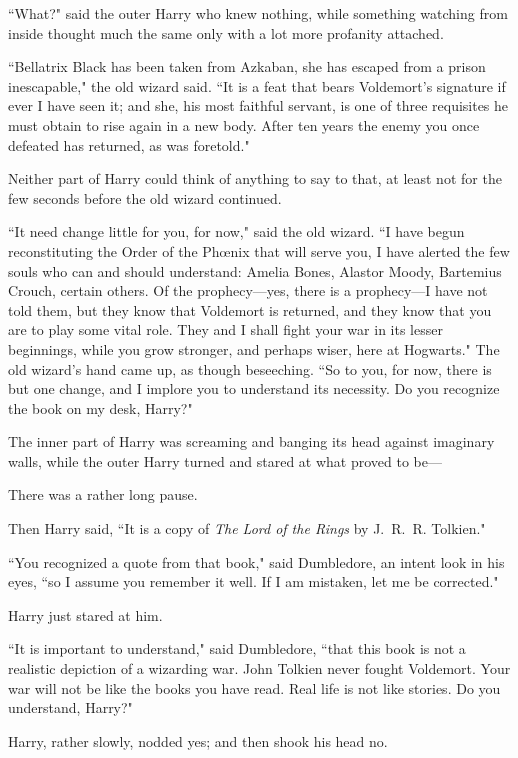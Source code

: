 ``What?" said the outer Harry who knew nothing, while something watching from inside thought much the same only with a lot more profanity attached.

``Bellatrix Black has been taken from Azkaban, she has escaped from a prison inescapable," the old wizard said. ``It is a feat that bears Voldemort's signature if ever I have seen it; and she, his most faithful servant, is one of three requisites he must obtain to rise again in a new body. After ten years the enemy you once defeated has returned, as was foretold."

Neither part of Harry could think of anything to say to that, at least not for the few seconds before the old wizard continued.

``It need change little for you, for now," said the old wizard. ``I have begun reconstituting the Order of the Phœnix that will serve you, I have alerted the few souls who can and should understand: Amelia Bones, Alastor Moody, Bartemius Crouch, certain others. Of the prophecy—yes, there is a prophecy—I have not told them, but they know that Voldemort is returned, and they know that you are to play some vital role. They and I shall fight your war in its lesser beginnings, while you grow stronger, and perhaps wiser, here at Hogwarts." The old wizard's hand came up, as though beseeching. ``So to you, for now, there is but one change, and I implore you to understand its necessity. Do you recognize the book on my desk, Harry?"

The inner part of Harry was screaming and banging its head against imaginary walls, while the outer Harry turned and stared at what proved to be—

There was a rather long pause.

Then Harry said, ``It is a copy of \emph{The Lord of the Rings} by J.~R.~R. Tolkien."

``You recognized a quote from that book," said Dumbledore, an intent look in his eyes, ``so I assume you remember it well. If I am mistaken, let me be corrected."

Harry just stared at him.

``It is important to understand," said Dumbledore, ``that this book is not a realistic depiction of a wizarding war. John Tolkien never fought Voldemort. Your war will not be like the books you have read. Real life is not like stories. Do you understand, Harry?"

Harry, rather slowly, nodded yes; and then shook his head no.

